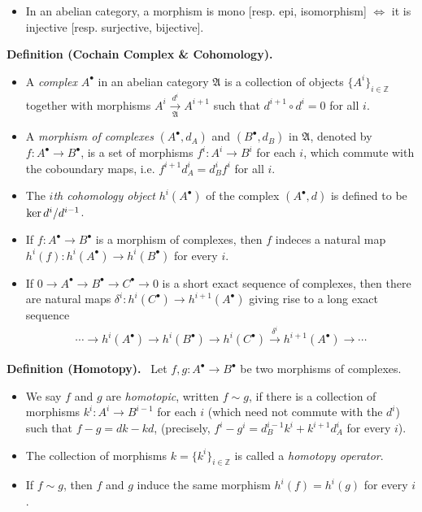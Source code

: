 \documentclass[11pt,a4paper,footinclude=true,headinclude=true]{scrbook} %
\let\Im\relax
\DeclareMathOperator{\Im}{Im}
\newcommand{\Af}{\mathfrak{A}}
\newcommand{\<}{\langle}
\newcommand{\>}{\rangle}
\newenvironment{definition}[2][Definition]
    { \begin{mdframed}[backgroundcolor=gray!20] \textbf{#1 #2.}\ }
    {  \end{mdframed}}
\newenvironment{remark*}[2][Remark]
    { \begin{mdframed}[backgroundcolor=gray!20] \textbf{#1.}\ }
    {  \end{mdframed}}
\begin{document}
\begin{remark*}{}\mbox{}
    \begin{itemize}
        \item In an abelian category, a morphism is mono [resp. epi, isomorphism] $\Longleftrightarrow$ it is injective [resp. surjective, bijective].
    \end{itemize}
\end{remark*}

\begin{definition}{(Cochain Complex \& Cohomology)}\mbox{}
    \begin{itemize}
        \item A \textit{complex} $A^\bullet$ in an abelian category $\Af$ is a collection of objects $\{A^i\}_{i\in\mathbb{Z}}$ together with morphisms $A^i\xrightarrow[\Af]{d^i}A^{i+1}$ such that $d^{i+1}\circ d^i=0$ for all $i$.
        \item A \textit{morphism of complexes} $(A^\bullet,d_A)$ and $(B^\bullet,d_B)$ in $\Af$, denoted by $f:A^\bullet\to B^\bullet$, is a set of morphisms $f^i:A^i\to B^i$ for each $i$, which commute with the coboundary maps, i.e. $f^{i+1}d_A^i=d_B^if^i$ for all $i$.
        \item The \textit{$i$th cohomology object} $h^i(A^\bullet)$ of the complex $(A^\bullet,d)$ is defined to be $\ker d^i/\Im d^{i-1}$. 
        \item If $f:A^\bullet\to B^\bullet$ is a morphism of complexes, then $f$ indeces a natural map $h^i(f):h^i(A^\bullet)\to h^i(B^\bullet)$ for every $i$.
        \item If $0\to A^\bullet\to B^\bullet\to C^\bullet\to0$ is a short exact sequence of complexes, then there are natural maps $\delta^i:h^i(C^\bullet)\to h^{i+1}(A^\bullet)$ giving rise to a long exact sequence
        \begin{align*}
            \cdots\to h^i(A^\bullet)\to h^i(B^\bullet)\to h^i(C^\bullet)\xrightarrow{\delta^i} h^{i+1}(A^\bullet)\to\cdots
        \end{align*}
    \end{itemize}
\end{definition}

\begin{definition}{(Homotopy)}
    Let $f,g:A^\bullet\to B^\bullet$ be two morphisms of complexes.
    \begin{itemize}
        \item We say $f$ and $g$ are \textit{homotopic}, written $f\sim g$, if there is a collection of morphisms $k^i:A^i\to B^{i-1}$ for each $i$ (which need not commute with the $d^i$) such that $f-g=dk-kd$, (precisely,  $f^i-g^i=d_B^{i-1}k^i+k^{i+1}d_A^i$ for every $i$).
        \item The collection of morphisms $k=\{k^i\}_{i\in \mathbb{Z}}$ is called a \textit{homotopy operator}.
        \item If $f\sim g$, then $f$ and $g$ induce the same morphism $h^i(f)=h^i(g)$ for every $i$.
    \end{itemize}
\end{definition}
\end{document}
